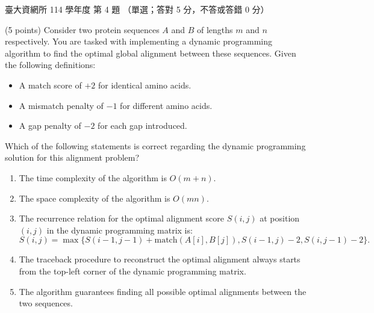 \begin{pastexam}[label={px:ntu-114-dsa-04}]{臺大資網所 114 學年度 第 4 題}
（單選；答對 5 分，不答或答錯 0 分）

(5 points) Consider two protein sequences $A$ and $B$ of lengths $m$ and $n$ respectively. You are tasked with
implementing a dynamic programming algorithm to find the optimal global alignment between these sequences.
Given the following definitions:
\begin{itemize}
\item A match score of $+2$ for identical amino acids.
\item A mismatch penalty of $-1$ for different amino acids.
\item A gap penalty of $-2$ for each gap introduced.
\end{itemize}
Which of the following statements is correct regarding the dynamic programming solution for this alignment
problem?
\begin{enumerate}[label=(\Alph*)]
\item The time complexity of the algorithm is $O(m+n)$.
\item The space complexity of the algorithm is $O(mn)$.
\item The recurrence relation for the optimal alignment score $S(i,j)$ at position $(i,j)$ in the dynamic
programming matrix is:
\[S(i,j)=\max\{S(i-1,j-1)+\mathrm{match}(A[i],B[j]),S(i-1,j)-2,S(i,j-1)-2\}.\]
\item The traceback procedure to reconstruct the optimal alignment always starts from the top-left corner of
the dynamic programming matrix.
\item The algorithm guarantees finding all possible optimal alignments between the two sequences.
\end{enumerate}
\end{pastexam}

